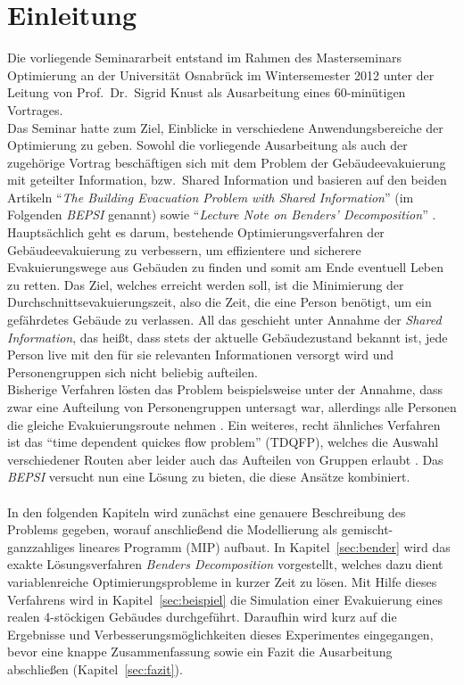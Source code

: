 \documentclass[a4paper, 11pt]{scrreprt}
\begin{document}
\onehalfspacing
\thispagestyle{empty}

\tableofcontents

\chapter{Einleitung}
Die vorliegende Seminararbeit entstand im Rahmen des Masterseminars
Optimierung an der Universität Osnabrück im Wintersemester 2012
unter der Leitung von Prof.\ Dr.\ Sigrid Knust als Ausarbeitung eines
60-minütigen Vortrages.\\
Das Seminar hatte zum Ziel, Einblicke in verschiedene Anwendungsbereiche der Optimierung zu geben.
Sowohl die vorliegende Ausarbeitung als auch der zugehörige Vortrag beschäftigen sich mit dem
Problem der Gebäudeevakuierung mit geteilter Information, bzw.\ Shared Information und basieren
auf den beiden Artikeln ``\textit{The Building Evacuation Problem with Shared Information}''
(im Folgenden \textit{BEPSI} genannt) \cite{bepsi}
sowie ``\textit{Lecture Note on Benders' Decomposition}'' \cite{bender}.
Hauptsächlich geht es darum, bestehende Optimierungsverfahren der Gebäudeevakuierung
zu verbessern, um effizientere und sicherere Evakuierungswege aus Gebäuden zu finden und somit
am Ende eventuell Leben zu retten.
Das Ziel, welches erreicht werden soll, ist die Minimierung der Durchschnittsevakuierungszeit, also die Zeit,
die eine Person benötigt, um ein gefährdetes Gebäude zu verlassen.
All das geschieht unter
Annahme der \textit{Shared Information}, das heißt, dass stets der aktuelle Gebäudezustand bekannt ist,
jede Person live mit den für sie relevanten Informationen versorgt wird und
Personengruppen sich nicht beliebig aufteilen.\\
Bisherige Verfahren lösten das Problem beispielsweise unter der Annahme, dass zwar eine Aufteilung
von Personengruppen untersagt war, allerdings alle Personen die gleiche Evakuierungsroute nehmen \cite{single_route}.
Ein weiteres, recht ähnliches Verfahren ist das ``time dependent quickes flow problem'' (TDQFP), welches die Auswahl
verschiedener Routen aber leider auch das Aufteilen von Gruppen erlaubt \cite{tdqfp}.
Das \textit{BEPSI} versucht nun eine Lösung zu bieten, die diese Ansätze kombiniert.\\
\\
In den folgenden Kapiteln wird zunächst eine genauere Beschreibung des Problems gegeben, worauf
anschließend die Modellierung als gemischt-ganzzahliges lineares Programm (MIP) aufbaut.
In Kapitel~\ref{sec:bender} wird das exakte Lösungsverfahren \textit{Benders Decomposition}
vorgestellt, welches dazu dient variablenreiche Optimierungsprobleme in kurzer Zeit zu lösen.
Mit Hilfe dieses Verfahrens wird in Kapitel~\ref{sec:beispiel} die Simulation einer Evakuierung
eines realen 4-stöckigen Gebäudes durchgeführt.
Daraufhin wird kurz auf die Ergebnisse und Verbesserungsmöglichkeiten dieses Experimentes eingegangen,
bevor eine knappe Zusammenfassung sowie ein Fazit die Ausarbeitung abschließen (Kapitel~\ref{sec:fazit}).
\end{document}
